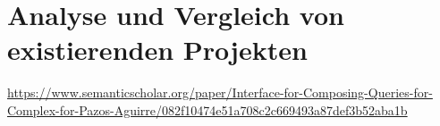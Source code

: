\section{Analyse und Vergleich von existierenden Projekten}
\url{https://www.semanticscholar.org/paper/Interface-for-Composing-Queries-for-Complex-for-Pazos-Aguirre/082f10474e51a708c2c669493a87def3b52aba1b}
